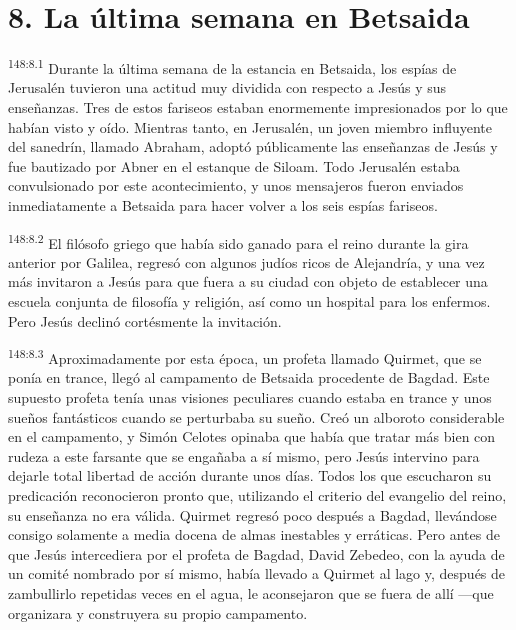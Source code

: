 \section*{8. La última semana en Betsaida}
\par 
\textsuperscript{148:8.1} Durante la última semana de la estancia en Betsaida, los espías de Jerusalén tuvieron una actitud muy dividida con respecto a Jesús y sus enseñanzas. Tres de estos fariseos estaban enormemente impresionados por lo que habían visto y oído. Mientras tanto, en Jerusalén, un joven miembro influyente del sanedrín, llamado Abraham, adoptó públicamente las enseñanzas de Jesús y fue bautizado por Abner en el estanque de Siloam. Todo Jerusalén estaba convulsionado por este acontecimiento, y unos mensajeros fueron enviados inmediatamente a Betsaida para hacer volver a los seis espías fariseos.

\par 
\textsuperscript{148:8.2} El filósofo griego que había sido ganado para el reino durante la gira anterior por Galilea, regresó con algunos judíos ricos de Alejandría, y una vez más invitaron a Jesús para que fuera a su ciudad con objeto de establecer una escuela conjunta de filosofía y religión, así como un hospital para los enfermos. Pero Jesús declinó cortésmente la invitación.

\par 
\textsuperscript{148:8.3} Aproximadamente por esta época, un profeta llamado Quirmet, que se ponía en trance, llegó al campamento de Betsaida procedente de Bagdad. Este supuesto profeta tenía unas visiones peculiares cuando estaba en trance y unos sueños fantásticos cuando se perturbaba su sueño. Creó un alboroto considerable en el campamento, y Simón Celotes opinaba que había que tratar más bien con rudeza a este farsante que se engañaba a sí mismo, pero Jesús intervino para dejarle total libertad de acción durante unos días. Todos los que escucharon su predicación reconocieron pronto que, utilizando el criterio del evangelio del reino, su enseñanza no era válida. Quirmet regresó poco después a Bagdad, llevándose consigo solamente a media docena de almas inestables y erráticas. Pero antes de que Jesús intercediera por el profeta de Bagdad, David Zebedeo, con la ayuda de un comité nombrado por sí mismo, había llevado a Quirmet al lago y, después de zambullirlo repetidas veces en el agua, le aconsejaron que se fuera de allí ---que organizara y construyera su propio campamento.

